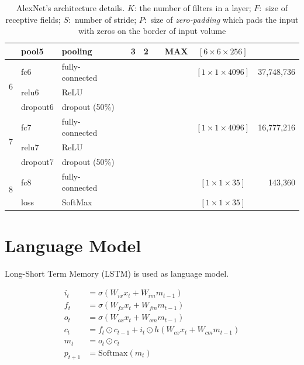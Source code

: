 \begin{table}
\begin{tabular}{|l|l|l|c|c|c|c|c|c|r|}
                          & pool5 & pooling & & 3 & 2 & & MAX & $\left[ 6 \times 6 \times 256 \right]$ & \\ \hline 
              \multirow{3}{*}{6} & fc6 & fully-connected & & & & & & $\left[ 1 \times 1 \times 4096 \right]$ & 37,748,736  \\ \cline{2-10}
                          & relu6 & ReLU & & & & & & & \\ \cline{2-10}
                          & dropout6 & dropout (50\%) & & & & & & & \\ \hline
              \multirow{3}{*}{7} & fc7 & fully-connected & & & & & & $\left[ 1 \times 1 \times 4096 \right]$ & 16,777,216 \\ \cline{2-10}
                          & relu7 & ReLU & & & & & & & \\ \cline{2-10}
                          & dropout7 & dropout (50\%) & & & & & & & \\ \hline
              \multirow{2}{*}{8} & fc8 & fully-connected & & & & & & $\left[ 1 \times 1 \times 35 \right]$ & 143,360 \\ \cline{2-10}
                          & loss & SoftMax & & & & & & $\left[ 1 \times 1 \times 35 \right]$ & \\ \hline
       \end{tabular}
       \caption*{AlexNet's architecture details. $K$: the number of filters in a layer; $F:$ size of receptive fields; $S:$ number of stride; $P:$ size of \emph{zero-padding} which pads the input with zeros on the border of input volume}

\end{table}

\section{Language Model}

Long-Short Term Memory (LSTM) \cite{Hochreiter:1997:LSM:1246443.1246450} is used as language model. 

\begin{align}
  i_t &= \sigma \left( W_{ix}x_t + W_{im}m_{t-1}\right) \\
  f_t &= \sigma \left( W_{fx}x_t + W_{fm}m_{t-1}\right) \\
  o_t &= \sigma \left( W_{ox}x_t + W_{om}m_{t-1}\right) \\
  c_t &= f_t \odot c_{t-1} + i_t \odot h\left( W_{cx}x_t + W_{cm}m_{t-1}\right)\\
  m_t &= o_t \odot c_t \\
  p_{t+1} &= \text{Softmax} \left( m_t \right)
\end{align}
